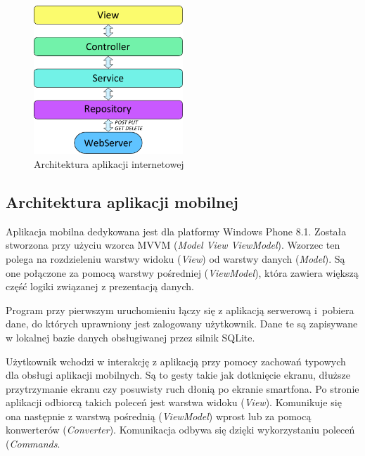 \documentclass{book}
\begin{document}
			\begin{figure}
							\centering
							\includegraphics[width=0.5\textwidth]{images/architektura_webapp.pdf}
							\caption{Architektura aplikacji internetowej}
							\label{fig:architektura_webapp}
    		\end{figure}		
			
			\subsection{Architektura aplikacji mobilnej}
			\label{sec:ArchitekturaAplikacjiMobilnej}	
			
			
			Aplikacja mobilna dedykowana jest dla platformy Windows Phone 8.1. Została stworzona przy użyciu wzorca MVVM (\emph{Model View ViewModel}). Wzorzec ten polega na rozdzieleniu warstwy widoku (\emph{View}) od warstwy danych (\emph{Model}). Są one połączone za pomocą warstwy pośredniej (\emph{ViewModel}), która zawiera większą część logiki związanej z prezentacją danych. 
			
			Program przy pierwszym uruchomieniu łączy się z aplikacją serwerową i~pobiera dane, do których uprawniony jest zalogowany użytkownik. Dane te są zapisywane w lokalnej bazie danych obsługiwanej przez silnik SQLite. 
			
			Użytkownik wchodzi w interakcję z aplikacją przy pomocy zachowań typowych dla obsługi aplikacji mobilnych. Są to gesty takie jak dotknięcie ekranu, dłuższe przytrzymanie ekranu czy posuwisty ruch dłonią po ekranie smartfona. 
			Po stronie aplikacji odbiorcą takich poleceń jest warstwa widoku (\emph{View}). Komunikuje się ona następnie z warstwą pośrednią (\emph{ViewModel}) wprost lub za pomocą konwerterów (\emph{Converter}). Komunikacja odbywa się dzięki wykorzystaniu poleceń (\emph{Commands}. 
			
\end{document}

